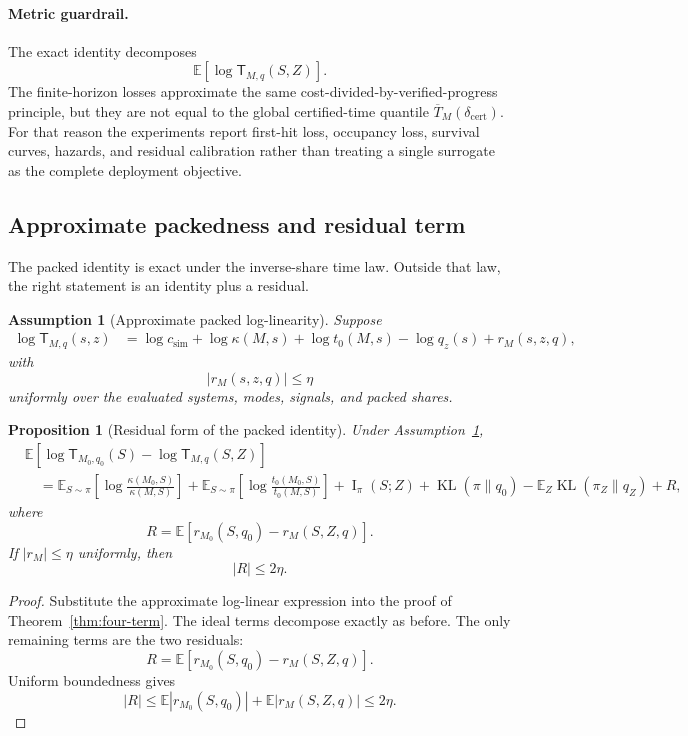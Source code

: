 \documentclass{article}
\newtheorem{assumption}{Assumption}
\newtheorem{proposition}{Proposition}
\DeclareMathOperator{\KL}{KL}
\DeclareMathOperator{\MI}{I}
\newcommand{\E}{\mathbb{E}}
\begin{document}
\paragraph{Metric guardrail.}
The exact identity decomposes
\[
    \E[\log \mathsf T_{M,q}(S,Z)].
\]
The finite-horizon losses approximate the same cost-divided-by-verified-progress principle,
but they are not equal to the global certified-time quantile
\(\overline T_M(\delta_{\mathrm{cert}})\).
For that reason the experiments report first-hit loss, occupancy loss, survival curves,
hazards, and residual calibration rather than treating a single surrogate as the complete
deployment objective.

\subsection{Approximate packedness and residual term}

The packed identity is exact under the inverse-share time law.  Outside that law, the
right statement is an identity plus a residual.

\begin{assumption}[Approximate packed log-linearity]
\label{ass:app-approx-packed}
Suppose
\[
\begin{aligned}
    \log \mathsf T_{M,q}(s,z)
    &=
    \log c_{\mathrm{sim}}
    +
    \log\kappa(M,s)
    +
    \log t_0(M,s)
    -
    \log q_z(s)
    +
    r_M(s,z,q),
\end{aligned}
\]
with
\[
    |r_M(s,z,q)|\le \eta
\]
uniformly over the evaluated systems, modes, signals, and packed shares.
\end{assumption}

\begin{proposition}[Residual form of the packed identity]
\label{prop:app-residual-decomp}
Under Assumption~\ref{ass:app-approx-packed},
\[
\begin{aligned}
&\E[
    \log \mathsf T_{M_0,q_0}(S)
    -
    \log \mathsf T_{M,q}(S,Z)
]
\\
&\quad =
\E_{S\sim\pi}
\left[
    \log\frac{\kappa(M_0,S)}{\kappa(M,S)}
\right]
+
\E_{S\sim\pi}
\left[
    \log\frac{t_0(M_0,S)}{t_0(M,S)}
\right]
+
\MI_\pi(S;Z)
+
\KL(\pi\|q_0)
-
\E_Z\KL(\pi_Z\|q_Z)
+
R,
\end{aligned}
\]
where
\[
    R=
    \E[r_{M_0}(S,q_0)-r_M(S,Z,q)].
\]
If \(|r_M|\le\eta\) uniformly, then
\[
    |R|\le 2\eta.
\]
\end{proposition}

\begin{proof}
Substitute the approximate log-linear expression into the proof of
Theorem~\ref{thm:four-term}.  The ideal terms decompose exactly as before.  The only
remaining terms are the two residuals:
\[
    R=
    \E[r_{M_0}(S,q_0)-r_M(S,Z,q)].
\]
Uniform boundedness gives
\[
    |R|
    \le
    \E|r_{M_0}(S,q_0)|+\E|r_M(S,Z,q)|
    \le 2\eta.
\]
\end{proof}
\end{document}
